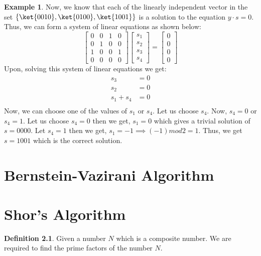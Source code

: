 \documentclass[12pt, oneside]{book}
\theoremstyle{definition}
\newtheorem{definition}{Definition}[section]
\theoremstyle{definition}
\newtheorem{example}{Example}[section]
\theoremstyle{remark}
\begin{document}
\begin{example}
    Now, we know that each of the linearly independent vector in the set $\{\ket{0010},\ket{0100},\ket{1001}\}$ is a solution to the equation $y\cdot s=0$. Thus, we can form a system of linear equations as shown below:
    \[
    \begin{bmatrix}
        0 & 0 & 1 & 0 \\
        0 & 1 & 0 & 0 \\
        1 & 0 & 0 & 1 \\
        0 & 0 & 0 & 0
    \end{bmatrix}
    \begin{bmatrix}
        s_1 \\
        s_2 \\
        s_3 \\
        s_4 
    \end{bmatrix}
    =
    \begin{bmatrix}
        0 \\
        0 \\
        0 \\
        0
    \end{bmatrix}
    \]
    Upon, solving this system of linear equations we get:
    \begin{align*}
    s_3&=0 \\
    s_2&=0 \\
    s_1 + s_4 &=0 \\
    \end{align*}
    Now, we can choose one of the values of $s_1$ or $s_4$. Let us choose $s_4$.
    Now, $s_4=0$ or $s_4=1$. 
    Let us choose $s_4=0$ then we get, $s_1=0$ which gives a trivial solution of $s=0000$. Let $s_4=1$ then we get, $s_1=-1\implies (-1) mod 2=1$.
    Thus, we get $s=1001$ which is the correct solution.
\end{example}



\chapter{Bernstein-Vazirani Algorithm}

\chapter{Shor's Algorithm}
\begin{definition}
    Given a number $N$ which is a composite number. We are required to find the prime factors of the number $N$.
\end{definition}
\end{document}
